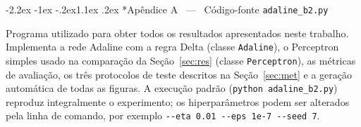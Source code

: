 \documentclass[12pt,a4paper]{article}
\makeatletter
\renewcommand\section{\@startsection{section}{1}{\z@}%
  {-2.2ex \@plus -1ex \@minus -.2ex}{1.1ex \@plus .2ex}%
  {\normalfont\large\bfseries}}
\makeatother
\begin{document}
\clearpage
\section*{Ap\^endice A \, --- \, C\'odigo-fonte \texttt{adaline\_b2.py}}

\noindent
Programa utilizado para obter todos os resultados apresentados neste trabalho.
Implementa a rede Adaline com a regra Delta (classe \texttt{Adaline}), o
Perceptron simples usado na compara\c{c}\~ao da Se\c{c}\~ao~\ref{sec:res}
(classe \texttt{Perceptron}), as m\'etricas de avalia\c{c}\~ao, os tr\^es
protocolos de teste descritos na Se\c{c}\~ao~\ref{sec:met} e a gera\c{c}\~ao
autom\'atica de todas as figuras. A execu\c{c}\~ao padr\~ao
(\texttt{python adaline\_b2.py}) reproduz integralmente o experimento; os
hiperpar\^ametros podem ser alterados pela linha de comando, por exemplo
\texttt{-{}-eta 0.01 -{}-eps 1e-7 -{}-seed 7}.

\vspace{0.3cm}

{\singlespacing
{}%
  {}%
  {}%
}
\end{document}
